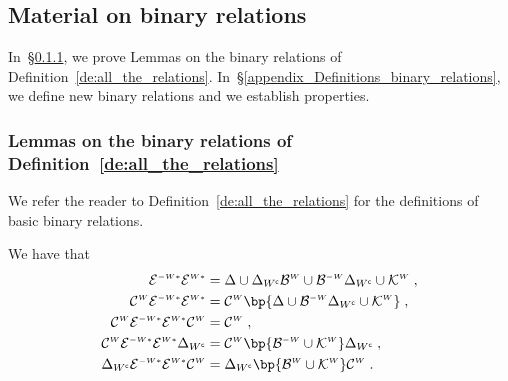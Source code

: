 \documentclass[12pt]{article}
\begin{document}
{{{\subsection{Material on binary relations}
\label{Material_on_binary_relations}

In~\S\ref{appendix_Lemmas_binary_relations},
we prove Lemmas on the binary relations of
Definition~\ref{de:all_the_relations}.
In~\S\ref{appendix_Definitions_binary_relations},
we define new binary relations and we establish properties.


\subsubsection{Lemmas on the binary relations of Definition~\ref{de:all_the_relations}}
\label{appendix_Lemmas_binary_relations}

We refer the reader to Definition~\ref{de:all_the_relations}
for the definitions of basic binary relations.

\begin{lemma}
  We have that
  \begin{subequations}
    \begin{align}
      \ConverseConditionalAncestor \ConditionalAncestor
      &=
        {\Delta 
        \cup
        \Delta_{\Complementary{\AgentSubsetW}} \ConditionalAscendent 
        \cup \ConverseConditionalAscendent \Delta_{\Complementary{\AgentSubsetW}}
        \cup \ConditionalCommonCause
        }
        \eqfinv
        \label{eq:AA}
      \\
      \Cousinhood \ConverseConditionalAncestor \ConditionalAncestor
      &=
        \Cousinhood \bp{
        \Delta \cup
        \ConverseConditionalAscendent
        \Delta_{{\Complementary{\AgentSubsetW}}}
        \cup \ConditionalCommonCause}
        \eqfinv
        \label{eq:CEmEsubset}
     \\
      \Cousinhood \ConverseConditionalAncestor \ConditionalAncestor \Cousinhood
      &= \Cousinhood
        \eqfinv
        \label{eq:gammaAAgamma}
      \\
      \Cousinhood \ConverseConditionalAncestor \ConditionalAncestor
      \Delta_{\Complementary{\AgentSubsetW}}
      &= \Cousinhood \bp{
        \ConverseConditionalAscendent 
        \cup \ConditionalCommonCause}
        \Delta_{\Complementary{\AgentSubsetW}}
        \eqfinv
        \label{eq:gammaAADelta}
      \\
      \Delta_{\Complementary{\AgentSubsetW}} \ConverseConditionalAncestor \ConditionalAncestor    \Cousinhood 
      &=
        \Delta_{\Complementary{\AgentSubsetW}}
        \bp{
        \ConditionalAscendent 
        \cup \ConditionalCommonCause}
        \Cousinhood
        \eqfinp
        \label{eq:DeltaAAgamma}
     \end{align}
  \end{subequations}
\end{lemma}




}}}
\end{document}

